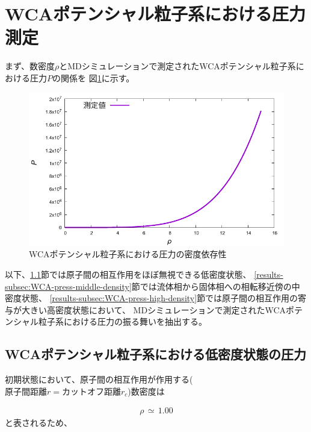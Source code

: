 \documentclass[titlepage]{jsreport}
\begin{document}
{{{\section{WCAポテンシャル粒子系における圧力測定}\label{results-sec:WCA-press}
まず、数密度$\rho$とMDシミュレーションで測定されたWCAポテンシャル粒子系における圧力$P$の関係を
図\ref{fig:den-pre}に示す。

\begin{figure}[htbp]
    \begin{center}
        \includegraphics[width=14cm]{fig/den-pre.pdf}
    \end{center}
    \caption{WCAポテンシャル粒子系における圧力の密度依存性}
    \label{fig:den-pre}
\end{figure}

\newpage
以下、\ref{results-subsec:WCA-press-low-density}節では原子間の相互作用をほぼ無視できる低密度状態、
\ref{results-subsec:WCA-press-middle-density}節では流体相から固体相への相転移近傍の中密度状態、
\ref{results-subsec:WCA-press-high-density}節では原子間の相互作用の寄与が大きい高密度状態において、
MDシミュレーションで測定されたWCAポテンシャル粒子系における圧力の振る舞いを抽出する。

\subsection{WCAポテンシャル粒子系における低密度状態の圧力}\label{results-subsec:WCA-press-low-density}
初期状態において、原子間の相互作用が作用する($原子間距離r=カットオフ距離r_c$)数密度は

\large
\begin{eqnarray}
\rho\,{\simeq}\,1.00 \nonumber
\end{eqnarray}
\normalsize
と表されるため、

}}}
\end{document}
